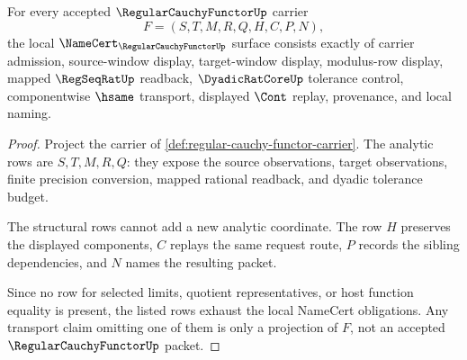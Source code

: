 \begin{theorem}
\label{thm:regular-cauchy-functor-namecert-obligations}
For every accepted $\RegularCauchyFunctorUp$ carrier
$$
F=(S,T,M,R,Q,H,C,P,N),
$$
the local $\NameCert_{\RegularCauchyFunctorUp}$ surface consists exactly of carrier admission, source-window display, target-window display, modulus-row display, mapped $\RegSeqRatUp$ readback, $\DyadicRatCoreUp$ tolerance control, componentwise $\hsame$ transport, displayed $\Cont$ replay, provenance, and local naming.
\end{theorem}
\begin{proof}
Project the carrier of \autoref{def:regular-cauchy-functor-carrier}. The analytic rows are $S,T,M,R,Q$: they expose the source observations, target observations, finite precision conversion, mapped rational readback, and dyadic tolerance budget.

The structural rows cannot add a new analytic coordinate. The row $H$ preserves the displayed components, $C$ replays the same request route, $P$ records the sibling dependencies, and $N$ names the resulting packet.

Since no row for selected limits, quotient representatives, or host function equality is present, the listed rows exhaust the local NameCert obligations. Any transport claim omitting one of them is only a projection of $F$, not an accepted $\RegularCauchyFunctorUp$ packet.
\end{proof}


